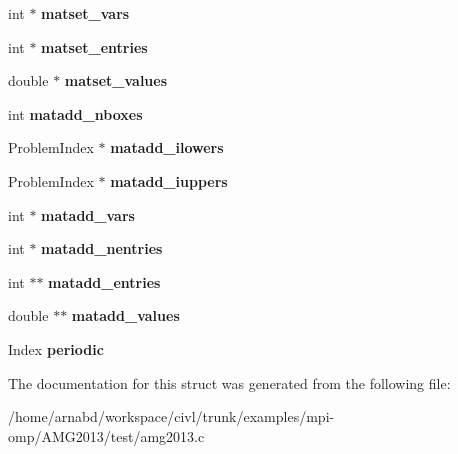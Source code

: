 \begin{DoxyCompactItemize}
\item 
\hypertarget{structProblemPartData_a0c70675f5b066cc466c9c25f4f58db37}{}int $\ast$ {\bfseries matset\+\_\+vars}\label{structProblemPartData_a0c70675f5b066cc466c9c25f4f58db37}

\item 
\hypertarget{structProblemPartData_a1d244efe2cbf6d83cef90056169cd0db}{}int $\ast$ {\bfseries matset\+\_\+entries}\label{structProblemPartData_a1d244efe2cbf6d83cef90056169cd0db}

\item 
\hypertarget{structProblemPartData_a72ddfac519bee20960db992606ef1fcd}{}double $\ast$ {\bfseries matset\+\_\+values}\label{structProblemPartData_a72ddfac519bee20960db992606ef1fcd}

\item 
\hypertarget{structProblemPartData_a6dd1405a7c7bc973f3e7ba25d72d7f43}{}int {\bfseries matadd\+\_\+nboxes}\label{structProblemPartData_a6dd1405a7c7bc973f3e7ba25d72d7f43}

\item 
\hypertarget{structProblemPartData_a15226f20dc3faa73dad670032607b60d}{}Problem\+Index $\ast$ {\bfseries matadd\+\_\+ilowers}\label{structProblemPartData_a15226f20dc3faa73dad670032607b60d}

\item 
\hypertarget{structProblemPartData_a71f41870f4f90bb5d7556c8d9b49bce2}{}Problem\+Index $\ast$ {\bfseries matadd\+\_\+iuppers}\label{structProblemPartData_a71f41870f4f90bb5d7556c8d9b49bce2}

\item 
\hypertarget{structProblemPartData_a42caa87001acd4f2daed7e13c381ac71}{}int $\ast$ {\bfseries matadd\+\_\+vars}\label{structProblemPartData_a42caa87001acd4f2daed7e13c381ac71}

\item 
\hypertarget{structProblemPartData_ac8359d74594345e545da6b4b29883cea}{}int $\ast$ {\bfseries matadd\+\_\+nentries}\label{structProblemPartData_ac8359d74594345e545da6b4b29883cea}

\item 
\hypertarget{structProblemPartData_a649cba4a81cfbcacb43d6ba5806930da}{}int $\ast$$\ast$ {\bfseries matadd\+\_\+entries}\label{structProblemPartData_a649cba4a81cfbcacb43d6ba5806930da}

\item 
\hypertarget{structProblemPartData_ac17fc02fa022dcd34c52bc3c1fe4242a}{}double $\ast$$\ast$ {\bfseries matadd\+\_\+values}\label{structProblemPartData_ac17fc02fa022dcd34c52bc3c1fe4242a}

\item 
\hypertarget{structProblemPartData_a3d4774dbe4d6267926862cc0a7b9e920}{}Index {\bfseries periodic}\label{structProblemPartData_a3d4774dbe4d6267926862cc0a7b9e920}

\end{DoxyCompactItemize}


The documentation for this struct was generated from the following file\+:\begin{DoxyCompactItemize}
\item 
/home/arnabd/workspace/civl/trunk/examples/mpi-\/omp/\+A\+M\+G2013/test/amg2013.\+c\end{DoxyCompactItemize}
